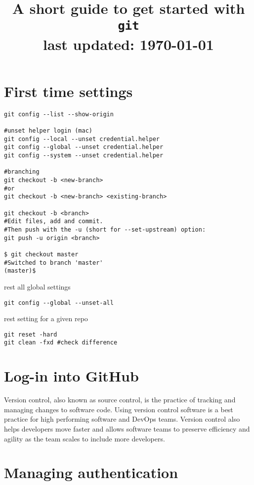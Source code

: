 \documentclass[11pt]{article}
\title{A short guide to get started with \texttt{git} \\[2em] \small{last updated: \today}}
\date{}
\begin{document}
\maketitle

\section*{First time settings}

\begin{lstlisting}
git config --list --show-origin

#unset helper login (mac)
git config --local --unset credential.helper
git config --global --unset credential.helper
git config --system --unset credential.helper

#branching
git checkout -b <new-branch>
#or
git checkout -b <new-branch> <existing-branch>

git checkout -b <branch>
#Edit files, add and commit. 
#Then push with the -u (short for --set-upstream) option:
git push -u origin <branch>

$ git checkout master
#Switched to branch 'master'
(master)$
\end{lstlisting}

rest all global settings

\begin{lstlisting}
git config --global --unset-all	
\end{lstlisting}

rest setting for a given repo
\begin{lstlisting}
git reset -hard
git clean -fxd #check difference
\end{lstlisting}


\section*{Log-in into GitHub}

Version control, also known as source control, is the practice of tracking and managing changes to software code. Using version control software is a best practice for high performing software and DevOps teams. Version control also helps developers move faster and allows software teams to preserve efficiency and agility as the team scales to include more developers.

\section*{Managing authentication}
\end{document}
